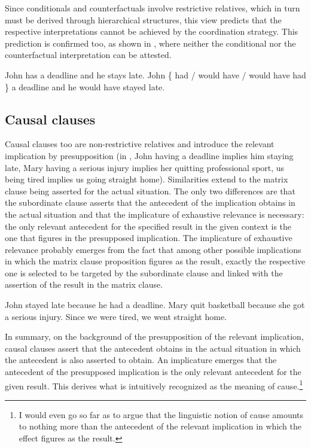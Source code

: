 \documentclass[output=paper,
colorlinks,
citecolor=brown,
newtxmath
]{langscibook}
\begin{document}
\noindent Since conditionals and counterfactuals involve restrictive relatives, which in turn must be derived through hierarchical structures, this view predicts that the respective interpretations cannot be achieved by the coordination strategy. This prediction is confirmed too, as shown in , where neither the conditional nor the counterfactual interpretation can be attested.

\ea\label{ex:CondTest}
\ea John has a deadline and he stays late.\label{ex:CondTest-a}
\ex John \{ had / would have / would have had \} a deadline and he would have stayed late.\label{ex:CondTest-b}
\z\z

\subsection{Causal clauses}

Causal clauses too are non-restrictive relatives and introduce the relevant implication by presupposition (in , John having a deadline implies him staying late, Mary having a serious injury implies her quitting professional sport, us being tired implies us going straight home). Similarities extend to the matrix clause being asserted for the actual situation. The only two differences are that the subordinate clause asserts that the antecedent of the implication obtains in the actual situation and that the implicature of exhaustive relevance is necessary: the only relevant antecedent for the specified result in the given context is the one that figures in the presupposed implication. The implicature of exhaustive relevance probably emerges from the fact that among other possible implications in which the matrix clause proposition figures as the result, exactly the respective one is selected to be targeted by the subordinate clause and linked with the assertion of the result in the matrix clause.

\ea\label{ex:Causal1}
\ea John stayed late because he had a deadline.\label{ex:Causal1-a}
\ex Mary quit basketball because she got a serious injury.\label{ex:Causal1-b}
\ex Since we were tired, we went straight home.\label{ex:Causal1-c}
\z\z

\noindent In summary, on the background of the presupposition of the relevant implication, causal clauses assert that the antecedent obtains in the actual situation in which the antecedent is also asserted to obtain. An implicature emerges that the antecedent of the presupposed implication is the only relevant antecedent for the given result. This derives what is intuitively recognized as the meaning of cause.\footnote{I would even go so far as to argue that the linguistic notion of cause amounts to nothing more than the antecedent of the relevant implication in which the effect figures as the result.}
\end{document}

